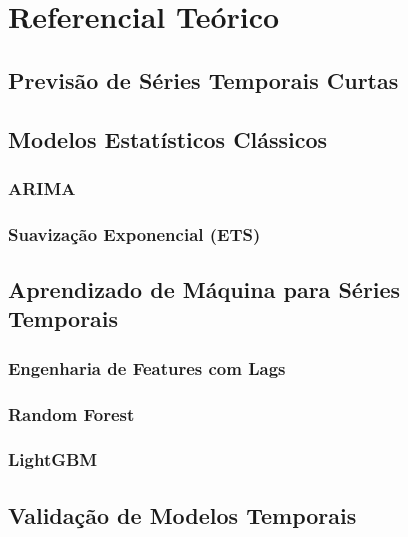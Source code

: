 \documentclass[12pt, a4paper]{article}
\begin{document}
\newpage
\section{Referencial Teórico}
\label{sec:referencial}


\subsection{Previsão de Séries Temporais Curtas}

\subsection{Modelos Estatísticos Clássicos}

\subsubsection{ARIMA}

\subsubsection{Suavização Exponencial (ETS)}

\subsection{Aprendizado de Máquina para Séries Temporais}

\subsubsection{Engenharia de Features com Lags}


\subsubsection{Random Forest}


\subsubsection{LightGBM}


\subsection{Validação de Modelos Temporais}
\end{document}
